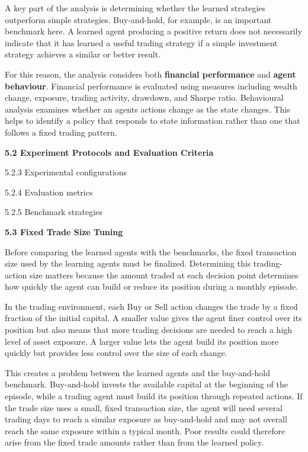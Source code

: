 A key part of the analysis is determining whether the learned strategies
outperform simple strategies. Buy-and-hold, for example, is an important
benchmark here. A learned agent producing a positive return does not
necessarily indicate that it has learned a useful trading strategy if a
simple investment strategy achieves a similar or better result.

For this reason, the analysis considers both \textbf{financial
performance} and \textbf{agent behaviour}. Financial performance is
evaluated using measures including wealth change, exposure, trading
activity, drawdown, and Sharpe ratio. Behavioural analysis examines
whether an agent\textquotesingle s actions change as the state changes.
This helps to identify a policy that responds to state information
rather than one that follows a fixed trading pattern.

\textbf{5.2 Experiment Protocols and Evaluation Criteria}

5.2.3 Experimental configurations

5.2.4 Evaluation metrics

5.2.5 Benchmark strategies

\textbf{5.3 Fixed Trade Size Tuning}

Before comparing the learned agents with the benchmarks, the fixed
transaction size used by the learning agents must be finalized.
Determining this trading-action size matters because the amount traded
at each decision point determines how quickly the agent can build or
reduce its position during a monthly episode.

In the trading environment, each Buy or Sell action changes the trade by
a fixed fraction of the initial capital. A smaller value gives the agent
finer control over its position but also means that more trading
decisions are needed to reach a high level of asset exposure. A larger
value lets the agent build its position more quickly but provides less
control over the size of each change.

This creates a problem between the learned agents and the buy-and-hold
benchmark. Buy-and-hold invests the available capital at the beginning
of the episode, while a trading agent must build its position through
repeated actions. If the trade size uses a small, fixed transaction
size, the agent will need several trading days to reach a similar
exposure as buy-and-hold and may not overall reach the same exposure
within a typical month. Poor results could therefore arise from the
fixed trade amounts rather than from the learned policy.

